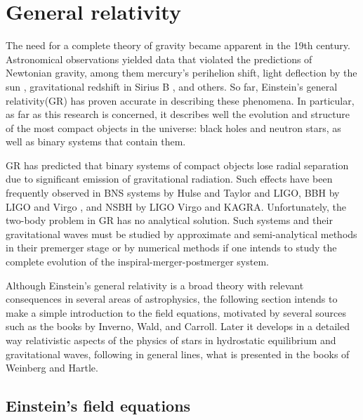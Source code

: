 \section{General relativity}

The need for a complete theory of gravity became apparent in the 19th century. Astronomical observations yielded data that violated the predictions of Newtonian gravity, among them mercury's perihelion shift\cite{1859AnPar...5....1L}, light deflection by the sun \cite{1920RSPTA.220..291D}, gravitational redshift in Sirius B \cite{2010JHA....41...41H}, and others. So far, Einstein's general relativity(GR) has proven accurate in describing these phenomena. In particular, as far as this research is concerned, it describes well the evolution and structure of the most compact objects in the universe: black holes and neutron stars, as well as binary systems that contain them.

GR has predicted that binary systems of compact objects lose radial separation due to significant emission of gravitational radiation. Such effects have been frequently observed in BNS systems by Hulse and Taylor \cite{Weisberg:1981mt} and LIGO\cite{LIGOScientific:2017vwq}, BBH by LIGO and Virgo \cite{LIGOScientific:2016aoc}, and NSBH by LIGO Virgo and KAGRA\cite{LIGOScientific:2021qlt}. Unfortunately, the two-body problem in GR has no analytical solution. Such systems and their gravitational waves must be studied by approximate and semi-analytical methods in their premerger stage or by numerical methods if one intends to study the complete evolution of the inspiral-merger-postmerger system\cite{Dietrich:2018phi}.

Although Einstein's general relativity is a broad theory with relevant consequences in several areas of astrophysics, the following section intends to make a simple introduction to the field equations, motivated by several sources such as the books by Inverno\cite{inverno}, Wald\cite{Wald:1984rg}, and Carroll\cite{carroll-notes}. Later it develops in a detailed way relativistic aspects of the physics of stars in hydrostatic equilibrium and gravitational waves, following in general lines, what is presented in the books of Weinberg\cite{Weinberg:1972kfs} and Hartle\cite{Hartle:2021pel}.



\subsection{Einstein's field equations}

